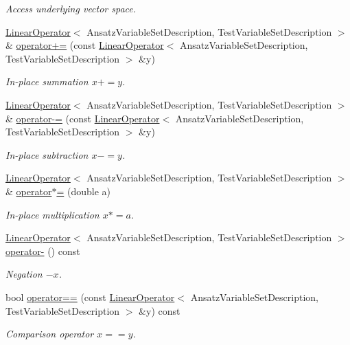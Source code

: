 \begin{DoxyCompactItemize}
\begin{DoxyCompactList}\small\item\em Access underlying vector space. \end{DoxyCompactList}\item 
\hyperlink{classSpacy_1_1Kaskade_1_1LinearOperator}{Linear\+Operator}$<$ Ansatz\+Variable\+Set\+Description, Test\+Variable\+Set\+Description $>$ \& \hyperlink{classSpacy_1_1AddArithmeticOperators_afad1d01e1e8c6f75290ac46d9b047ea8}{operator+=} (const \hyperlink{classSpacy_1_1Kaskade_1_1LinearOperator}{Linear\+Operator}$<$ Ansatz\+Variable\+Set\+Description, Test\+Variable\+Set\+Description $>$ \&y)
\begin{DoxyCompactList}\small\item\em In-\/place summation $ x+=y$. \end{DoxyCompactList}\item 
\hyperlink{classSpacy_1_1Kaskade_1_1LinearOperator}{Linear\+Operator}$<$ Ansatz\+Variable\+Set\+Description, Test\+Variable\+Set\+Description $>$ \& \hyperlink{classSpacy_1_1AddArithmeticOperators_a9fa91e177d13203cfe8cfa991c64ca36}{operator-\/=} (const \hyperlink{classSpacy_1_1Kaskade_1_1LinearOperator}{Linear\+Operator}$<$ Ansatz\+Variable\+Set\+Description, Test\+Variable\+Set\+Description $>$ \&y)
\begin{DoxyCompactList}\small\item\em In-\/place subtraction $ x-=y$. \end{DoxyCompactList}\item 
\hyperlink{classSpacy_1_1Kaskade_1_1LinearOperator}{Linear\+Operator}$<$ Ansatz\+Variable\+Set\+Description, Test\+Variable\+Set\+Description $>$ \& \hyperlink{classSpacy_1_1AddArithmeticOperators_a1d3db95b24fd2bc1de712c9e04c47e2f}{operator$\ast$=} (double a)
\begin{DoxyCompactList}\small\item\em In-\/place multiplication $ x*=a$. \end{DoxyCompactList}\item 
\hyperlink{classSpacy_1_1Kaskade_1_1LinearOperator}{Linear\+Operator}$<$ Ansatz\+Variable\+Set\+Description, Test\+Variable\+Set\+Description $>$ \hyperlink{classSpacy_1_1AddArithmeticOperators_a5acd030bf265d130983fd6e3c5b68be5}{operator-\/} () const
\begin{DoxyCompactList}\small\item\em Negation $ -x$. \end{DoxyCompactList}\item 
bool \hyperlink{classSpacy_1_1AddArithmeticOperators_a5ff1909f49f4a705d69663dc2d4b6316}{operator==} (const \hyperlink{classSpacy_1_1Kaskade_1_1LinearOperator}{Linear\+Operator}$<$ Ansatz\+Variable\+Set\+Description, Test\+Variable\+Set\+Description $>$ \&y) const
\begin{DoxyCompactList}\small\item\em Comparison operator $ x==y$. \end{DoxyCompactList}\end{DoxyCompactItemize}


